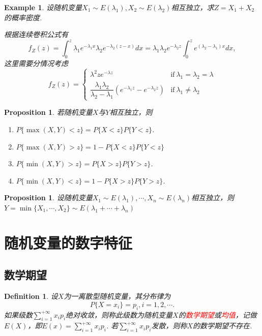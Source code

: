 \documentclass{article}
\newtheorem{proposition}[theorem]{Proposition}
\newtheorem{example}[theorem]{Example}
\newtheorem{definition}[theorem]{Definition}
\newcommand{\redt}[1]{\textcolor{red}{#1}}
\begin{document}
\begin{example}
\rm 设随机变量$X_1 \sim E(\lambda_1),X_2 \sim E(\lambda_2)$相互独立，求$Z = X_1 + X_2$的概率密度. 

根据连续卷积公式有
$$
f_Z(z) = \int_0^{z} \lambda_1 e^{-\lambda_1x}\lambda_2 e^{-\lambda_2(z-x)}dx = \lambda_1\lambda_2 e^{-\lambda_2z} \int_0^{z} e^{(\lambda_2 - \lambda_1)x}dx,   
$$
这里需要分情况考虑
$$
f_Z(z) = \left \{ \begin{array}{ll}
\lambda^2 ze^{-\lambda z} & \text{if}~\lambda_1 = \lambda_2 = \lambda \\
\dfrac {\lambda _{1}\lambda _{2}}{\lambda _{2}-\lambda _{1}}\left(e^{-\lambda _{1}z}-e^{-\lambda _{2}z}\right) & \text{if}~\lambda_1 \neq \lambda_2
\end{array} \right.
$$
\end{example}

\begin{proposition}
\rm 若随机变量$X$与$Y$相互独立，则
\begin{enumerate}
	\item $P\{\max(X,Y) < z\} = P\{X < z\}P\{Y < z\}$.
	\item $P\{\max(X,Y) > z\} = 1-  P\{X < z\}P\{Y < z\}$
	\item $P\{\min(X,Y) > z\} = P\{X>z\}P\{Y>z\}$.  
	\item $P\{\min(X,Y) < z\} = 1-P\{X>z\}P\{Y>z\}$.
\end{enumerate}
\end{proposition}

\begin{proposition}
\rm 设随机变量$X_1 \sim E(\lambda_1),\cdots,X_n \sim E(\lambda_n)$相互独立，则$Y = \min\{X_1,\cdots,X_2\} \sim E(\lambda_1 +\cdots +\lambda_n)$
\end{proposition}

\newpage
\section{随机变量的数字特征}

\subsection{数学期望}

\begin{definition}
\rm 设$X$为一离散型随机变量，其分布律为
$$
P\{X=x_i\} = p_i, i= 1,2,\cdots.
$$
如果级数$\sum\limits_{i=1}^{+\infty}x_ip_i$绝对收敛，则称此级数为随机变量$X$的\redt{数学期望}或\redt{均值}，记做$E(X)$，即$E(x) = \sum\limits_{i=1}^{+\infty}x_ip_i$. 若$\sum\limits_{i=1}^{+\infty}x_ip_i$发散，则称$X$的数学期望不存在. 
\end{definition}
\end{document}
